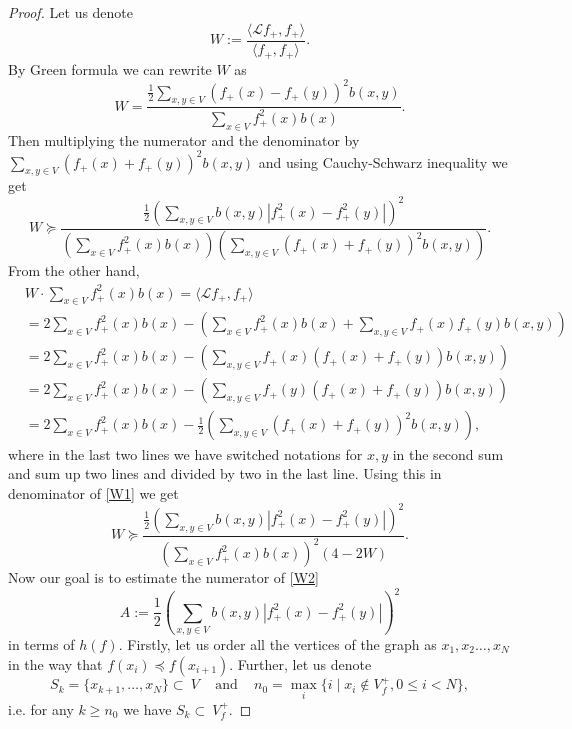\documentclass[10pt,a4paper]{amsart}
\renewcommand{\L}{\mathcal{L}}
\begin{document}
\begin{proof}
Let us denote
\begin{equation*}
W:=\dfrac{\langle\L f_+, f_+\rangle}{\langle f_+, f_+\rangle}.
\end{equation*}
By Green formula we can rewrite $W$ as 
\begin{equation*}
W=\dfrac{\frac{1}{2}\sum_{x,y\in V}(f_+(x)-f_+(y))^2b(x,y)}{\sum_{x\in V}f_+^2(x)b(x)}.
\end{equation*}
Then multiplying the numerator and the denominator by $\sum_{x,y\in V}(f_+(x)+f_+(y))^2b(x,y)$ and using Cauchy-Schwarz inequality we get
\begin{equation}\label{W1}
W\succeq \dfrac{\frac{1}{2}\left(\sum_{x,y\in V}b(x,y)\left|f_+^2(x)-f_+^2(y)\right|\right)^2}{\left(\sum_{x\in V}f_+^2(x)b(x)\right)\left(\sum_{x,y\in V}(f_+(x)+f_+(y))^2b(x,y)\right)}.
\end{equation}
From the other hand,
\begin{align*}
&W\cdot {\sum_{x\in V}f_+^2(x)b(x)}=\langle\L f_+,f_+\rangle\\
&=2\sum_{x\in V}f_+^2(x)b(x)-\left(\sum_{x\in V}f_+^2(x)b(x)+\sum_{x,y\in V}f_+(x)f_+(y)b(x,y)\right)\\
&=2\sum_{x\in V}f_+^2(x)b(x)-\left(\sum_{x,y\in V}f_+(x)(f_+(x)+f_+(y))b(x,y)\right)
\\
&=2\sum_{x\in V}f_+^2(x)b(x)-\left(\sum_{x,y\in V}f_+(y)(f_+(x)+f_+(y))b(x,y)\right)\\
&=2\sum_{x\in V}f_+^2(x)b(x)-\frac12\left(\sum_{x,y\in V}(f_+(x)+f_+(y))^2b(x,y)\right),
\end{align*}
where in the last two lines we have switched notations for $x,y$ in the second sum and sum up two lines and divided by two in the last line. Using this in denominator of \eqref{W1} we get
\begin{equation}\label{W2}
W\succeq\dfrac{\frac{1}{2}\left(\sum_{x,y\in V}b(x,y)\left|f_+^2(x)-f_+^2(y)\right|\right)^2}{\left(\sum_{x\in V}f_+^2(x)b(x)\right)^2\left(4-2 W\right)}.
\end{equation}
Now our goal is to estimate the numerator of \eqref{W2}
$$
A:=\frac{1}{2}\left(\sum_{x,y\in V}b(x,y)\left|f_+^2(x)-f_+^2(y)\right|\right)^2
$$ 
in terms of $h(f)$.
Firstly, let us order all the vertices of the graph as $x_1,x_2\dots,x_N$ in the way that $f(x_i)\preceq f(x_{i+1})$. Further, let us denote 
$$
S_k=\{x_{k+1},\dots,x_N\}\subset~V\;\;\;\mbox{ and }\;\;\;n_0=\max_i\{i\mid x_i\not \in V^+_f, 0\le i<N \},
$$
i.e. for any $k\ge n_0$ we have $S_k\subset~V^+_f$.


\end{proof}
\end{document}

